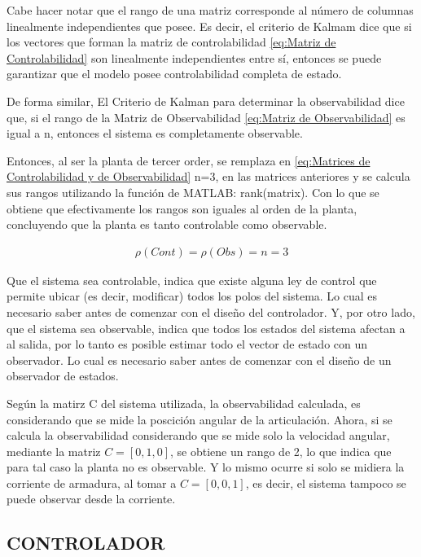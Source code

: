 \documentclass{article}
\begin{document}
\begin{sloppypar}
Cabe hacer notar que el rango de una matriz corresponde al número de columnas linealmente independientes que posee. Es decir, el criterio de Kalmam dice que si los vectores que forman la matriz de controlabilidad \ref{eq:Matriz de Controlabilidad} son linealmente independientes entre sí, entonces se puede garantizar que el modelo posee controlabilidad completa de estado.

De forma similar, El Criterio de Kalman para determinar la observabilidad dice que, si el rango de la Matriz de Observabilidad \ref{eq:Matriz de Observabilidad} es igual a n, entonces el sistema es completamente observable.

Entonces, al ser la planta de tercer order, se remplaza en \ref{eq:Matrices de Controlabilidad y de Observabilidad} n=3, en las matrices anteriores y se calcula sus rangos utilizando la función de MATLAB: rank(matrix). Con lo que se obtiene que efectivamente los rangos son iguales al orden de la planta, concluyendo que la planta es tanto controlable como observable.

\begin{align} \label{eq:Rangos de las Matrices de Controlabilidad y de Observabilidad}
    \rho(Cont)=\rho(Obs)=n=3
\end{align}

Que el sistema sea controlable, indica que existe alguna ley de control que permite ubicar (es decir, modificar) todos los polos del sistema. Lo cual es necesario saber antes de comenzar con el diseño del controlador.
Y, por otro lado, que el sistema sea observable, indica que todos los estados del sistema afectan a al salida, por lo tanto es posible estimar todo el vector de estado con un observador. Lo cual es necesario saber antes de comenzar con el diseño de un observador de estados.

Según la matirz C del sistema utilizada, la observabilidad calculada, es considerando que se mide la poscición angular de la articulación.
Ahora, si se calcula la observabilidad considerando que se mide solo la velocidad angular, mediante la matriz $C=[0, 1, 0]$, se obtiene un rango de 2, lo que indica que para tal caso la planta no es observable. Y lo mismo ocurre si solo se midiera la corriente de armadura, al tomar a $C=[0, 0, 1]$, es decir, el sistema tampoco se puede observar desde la corriente.


\subsection{CONTROLADOR}
\label{sec:CONTROLADOR}


\end{sloppypar}
\end{document}
